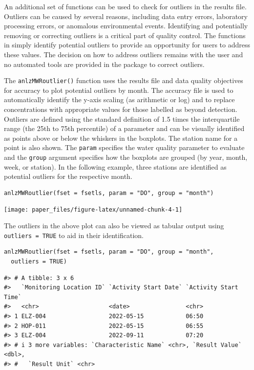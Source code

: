 An additional set of functions can be used to check for outliers in the results file. Outliers can be caused by several reasons, including data entry errors, laboratory processing errors, or anomalous environmental events. Identifying and potentially removing or correcting outliers is a critical part of quality control. The functions in  simply identify potential outliers to provide an opportunity for users to address these values. The decision on how to address outliers remains with the user and no automated tools are provided in the package to correct outliers.

The \texttt{anlzMWRoutlier()} function uses the results file and data quality objectives for accuracy to plot potential outliers by month. The accuracy file is used to automatically identify the y-axis scaling (as arithmetic or log) and to replace concentrations with appropriate values for those labelled as beyond detection. Outliers are defined using the standard definition of 1.5 times the interquartile range (the 25th to 75th percentile) of a parameter and can be visually identified as points above or below the whiskers in the boxplots. The station name for a point is also shown. The \texttt{param} specifies the water quality parameter to evaluate and the \texttt{group} argument specifies how the boxplots are grouped (by year, month, week, or station). In the following example, three stations are identified as potential outliers for the respective month.

\begin{verbatim}
anlzMWRoutlier(fset = fsetls, param = "DO", group = "month")
\end{verbatim}

\begin{center}\texttt{[image: paper\_files/figure-latex/unnamed-chunk-4-1]} \end{center}

The outliers in the above plot can also be viewed as tabular output using \texttt{outliers\ =\ TRUE} to aid in their identification.

\begin{verbatim}
anlzMWRoutlier(fset = fsetls, param = "DO", group = "month", 
  outliers = TRUE)
\end{verbatim}

\begin{verbatim}
#> # A tibble: 3 x 6
#>   `Monitoring Location ID` `Activity Start Date` `Activity Start Time`
#>   <chr>                    <date>                <chr>                
#> 1 ELZ-004                  2022-05-15            06:50                
#> 2 HOP-011                  2022-05-15            06:55                
#> 3 ELZ-004                  2022-09-11            07:20                
#> # i 3 more variables: `Characteristic Name` <chr>, `Result Value` <dbl>,
#> #   `Result Unit` <chr>
\end{verbatim}

